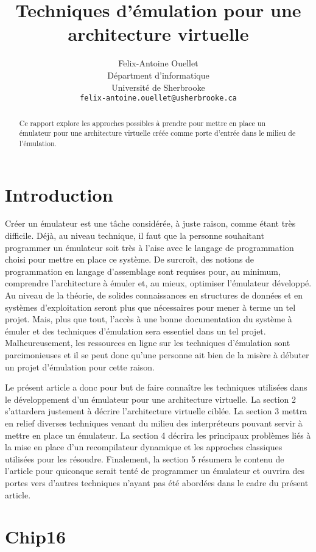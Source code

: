 \documentclass{article} %
\title{Techniques d'émulation pour une architecture virtuelle}
\author{
Felix-Antoine Ouellet \\
Départment d'informatique \\
Université de Sherbrooke \\
\texttt{felix-antoine.ouellet@usherbrooke.ca} \\
}
\begin{document}
\maketitle

\begin{abstract}
Ce rapport explore les approches possibles à prendre pour mettre en place un émulateur pour une architecture virtuelle créée comme porte d'entrée dans le milieu de l'émulation.
\end{abstract}

\section{Introduction}
Créer un émulateur est une tâche considérée, à juste raison, comme étant très difficile. Déjà, au niveau technique, il faut que la personne souhaitant programmer un émulateur soit très à l'aise avec le langage de programmation choisi pour mettre en place ce système. De surcroît, des notions de programmation en langage d'assemblage sont requises pour, au minimum, comprendre l'architecture à émuler et, au mieux, optimiser l'émulateur développé. Au niveau de la théorie, de solides connaissances en structures de données et en systèmes d'exploitation seront plus que nécessaires pour mener à terme un tel projet. Mais, plus que tout, l'accès à une bonne documentation du système à émuler et des techniques d'émulation sera essentiel dans un tel projet. Malheureusement, les ressources en ligne sur les techniques d'émulation sont parcimonieuses et il se peut donc qu'une personne ait bien de la misère à débuter un projet d'émulation pour cette raison.

Le présent article a donc pour but de faire connaître les techniques utilisées dans le développement d'un émulateur pour une architecture virtuelle. La section 2 s'attardera justement à décrire l'architecture virtuelle ciblée. La section 3 mettra en relief diverses techniques venant du milieu des interpréteurs pouvant servir à mettre en place un émulateur. La section 4 décrira les principaux problèmes liés à la mise en place d'un recompilateur dynamique et les approches classiques utilisées pour les résoudre. Finalement, la section 5 résumera le contenu de l'article pour quiconque serait tenté de programmer un émulateur et ouvrira des portes vers d'autres techniques n'ayant pas été abordées dans le cadre du présent article.

\section{Chip16}
\end{document}
